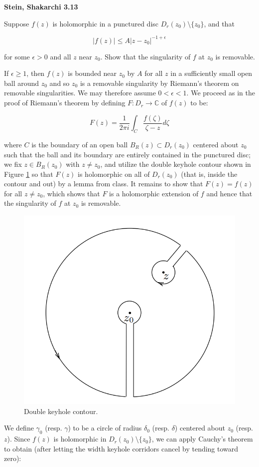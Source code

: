 \textbf{Stein, Shakarchi 3.13}

Suppose $f(z)$ is holomorphic in a punctured disc $D_r(z_0) \setminus \{z_0\}$, and that

$$
|f(z)| \le A|z - z_0|^{-1 + \epsilon}
$$

for some $\epsilon > 0$ and all $z$ near $z_0$. Show that the singularity of $f$ at $z_0$ is removable.

\begin{solution}
  If $\epsilon \ge 1$, then $f(z)$ is bounded near $z_0$ by $A$ for all $z$ in a sufficiently small open ball around 
  $z_0$ and so $z_0$ is a removable singularity by Riemann's theorem on removable singularities. We may therefore assume 
  $0 < \epsilon < 1$.  We proceed as in the proof of Riemann's theorem by defining $F: D_r \to \mathbb{C}$ of $f(z)$ to 
  be:

  $$
  F(z) = \frac{1}{2 \pi i} \int_C \frac{f(\zeta)}{\zeta - z} d\zeta
  $$

  where $C$ is the boundary of an open ball $B_R(z) \subset D_r(z_0)$ centered about $z_0$ such that the ball and its 
  boundary are entirely contained in the punctured disc; we fix $z \in B_R(z_0)$ with $z \neq z_0$, and utilize the 
  double keyhole contour shown in Figure \ref{fig:double_keyhole_contour} so that $F(z)$ is holomorphic on all of 
  $D_r(z_0)$ (that is, inside the contour and out) by a lemma from class. It remains to show that $F(z) = f(z)$ for all 
  $z \neq z_0$, which shows that $F$ is a holomorphic extension of $f$ and hence that the singularity of $f$ at $z_0$ is 
  removable. 

  \begin{figure}[h]
    \centering
    \includegraphics[width=0.4 \textwidth]{problem_7.png}
    \caption{Double keyhole contour.}
    \label{fig:double_keyhole_contour}
  \end{figure}

  We define $\gamma_0$ (resp. $\gamma$) to be a circle of radius $\delta_0$ (resp. $\delta$) centered about $z_0$ 
  (resp. $z$). Since $f(z)$ is holomorphic 
  in $D_r(z_0) \setminus \{z_0\}$, we can apply Cauchy's theorem to obtain (after letting the width keyhole corridors 
  cancel by tending toward zero):


\end{solution}
